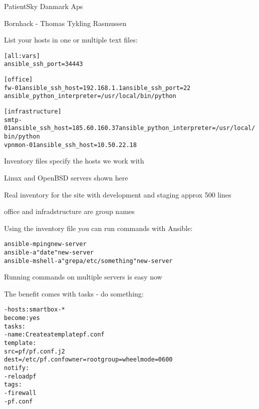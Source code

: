 \documentclass[18pt,landscape,a4paper,footrule]{foils}
\begin{document}

\begin{list2}
\item PatientSky Danmark Aps
\item Bornhack - Thomas Tykling Rasmussen
\end{list2}


List your hosts in one or multiple text files:
\begin{alltt}\footnotesize
[all:vars]
ansible_ssh_port=34443

[office]
fw-01 ansible_ssh_host=192.168.1.1 ansible_ssh_port=22
ansible_python_interpreter=/usr/local/bin/python

[infrastructure]
smtp-01     ansible_ssh_host=185.60.160.37 ansible_python_interpreter=/usr/local/bin/python
vpnmon-01   ansible_ssh_host=10.50.22.18

\end{alltt}

\begin{list2}
\item Inventory files specify the hosts we work with
\item Linux and OpenBSD servers shown here
\item Real inventory for the site with development and staging approx 500 lines
\item office and infradstructure are group names
\end{list2}



Using the inventory file you can run commands with Ansible:

\begin{alltt}\footnotesize
  ansible -m ping new-server
  ansible -a "date" new-server
  ansible -m shell -a "grep a /etc/something" new-server
\end{alltt}

\begin{list2}
\item Running commands on multiple servers is easy now
\end{list2}



The benefit comes with tasks - do something:

\begin{alltt}\footnotesize
  - hosts: smartbox-*
    become: yes
    tasks:
    - name: Create a template pf.conf
      template:
        src=pf/pf.conf.j2
        dest=/etc/pf.conf owner=root group=wheel mode=0600
     notify:
        - reload pf
      tags:
        - firewall
        - pf.conf
\end{alltt}
\end{document}

